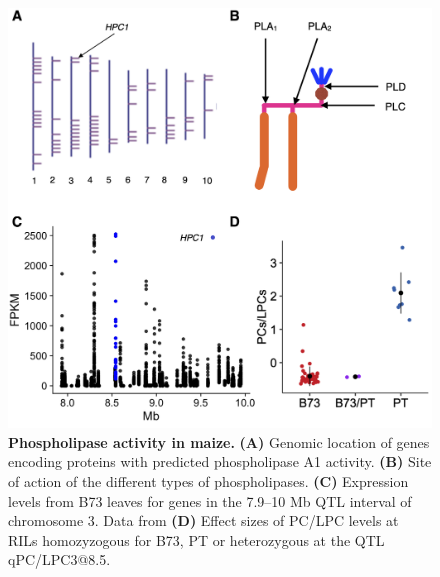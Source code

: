 \begin{subappendices}
\begin{figure}[t]
\begin{center}
\includegraphics[width=\linewidth]{Sup_Figures/Sup_Fig_3.png}
\caption[Phospholipase activity in maize.]{\textbf{Phospholipase activity in maize.} \textbf{(A)} Genomic location of genes encoding proteins with predicted phospholipase A1 activity. 
\textbf{(B)} Site of action of the different types of phospholipases.
\textbf{(C)} Expression levels from B73 leaves for genes in the 7.9--10 Mb QTL interval of chromosome 3. Data from \cite{stelpflug2016-vr}
\textbf{(D)} Effect sizes of PC/LPC levels at RILs homozyzogous for B73, PT or heterozygous at the QTL qPC/LPC3@8.5.
}
\label{figure::Sup:HPC1_misc}
\end{center}
\end{figure} 
\clearpage


\end{subappendices}
